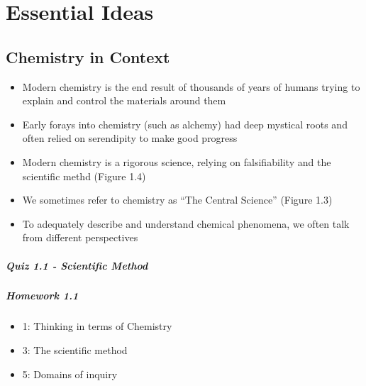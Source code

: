 \documentclass[12pt, openany, letterpaper]{memoir}
\begin{document}
\chapter{Essential Ideas}

\section{Chemistry in Context}
\begin{itemize}
  \item Modern chemistry is the end result of thousands of years of humans trying to explain and control the materials around them
  \item Early forays into chemistry (such as alchemy) had deep mystical roots and often relied on serendipity to make good progress
  \item Modern chemistry is a rigorous science, relying on falsifiability and the scientific methd (Figure 1.4)
  \item We sometimes refer to chemistry as ``The Central Science'' (Figure 1.3)
  \item To adequately describe and understand chemical phenomena, we often talk from different perspectives
\end{itemize}
\paragraph*{Quiz 1.1 - Scientific Method}
\paragraph*{Homework 1.1}
\begin{itemize}
  \item 1: Thinking in terms of Chemistry
  \item 3: The scientific method
  \item 5: Domains of inquiry
\end{itemize}
\end{document}

